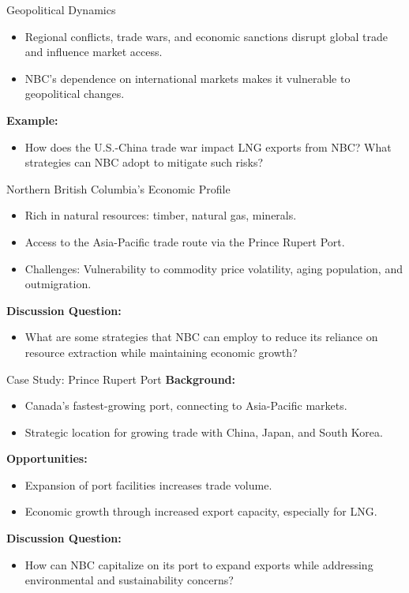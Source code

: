 \documentclass{beamer}
\begin{document}
\begin{frame}{Geopolitical Dynamics}
    \begin{itemize}
        \item Regional conflicts, trade wars, and economic sanctions disrupt global trade and influence market access.
        \item NBC’s dependence on international markets makes it vulnerable to geopolitical changes.
    \end{itemize}
    \textbf{Example:}
    \begin{itemize}
        \item How does the U.S.-China trade war impact LNG exports from NBC? What strategies can NBC adopt to mitigate such risks?
    \end{itemize}
\end{frame}

\begin{frame}{Northern British Columbia’s Economic Profile}
    \begin{itemize}
        \item Rich in natural resources: timber, natural gas, minerals.
        \item Access to the Asia-Pacific trade route via the Prince Rupert Port.
        \item Challenges: Vulnerability to commodity price volatility, aging population, and outmigration.
    \end{itemize}
    \textbf{Discussion Question:}
    \begin{itemize}
        \item What are some strategies that NBC can employ to reduce its reliance on resource extraction while maintaining economic growth?
    \end{itemize}
\end{frame}

\begin{frame}{Case Study: Prince Rupert Port}
    \textbf{Background:}
    \begin{itemize}
        \item Canada’s fastest-growing port, connecting to Asia-Pacific markets.
        \item Strategic location for growing trade with China, Japan, and South Korea.
    \end{itemize}
    \textbf{Opportunities:}
    \begin{itemize}
        \item Expansion of port facilities increases trade volume.
        \item Economic growth through increased export capacity, especially for LNG.
    \end{itemize}
    \textbf{Discussion Question:}
    \begin{itemize}
        \item How can NBC capitalize on its port to expand exports while addressing environmental and sustainability concerns?
    \end{itemize}
\end{frame}
\end{document}
